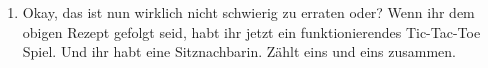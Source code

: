 \begin{spiel}
	\begin{enumerate}
		\item
		      Okay, das ist nun wirklich nicht schwierig zu erraten oder?
		      Wenn ihr dem obigen Rezept gefolgt seid, habt ihr jetzt ein funktionierendes Tic-Tac-Toe Spiel.
		      Und ihr habt eine Sitznachbarin.
		      Zählt eins und eins zusammen.
	\end{enumerate}
\end{spiel}
